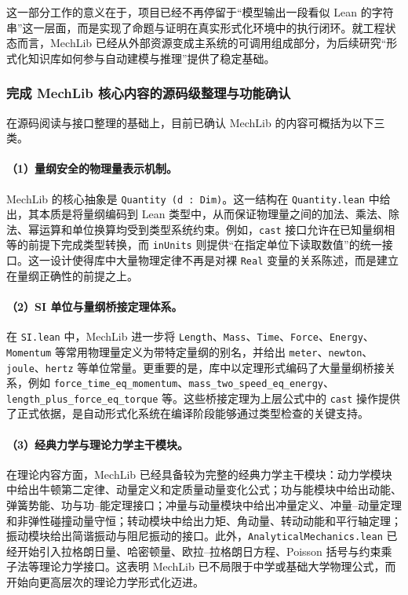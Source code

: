 \documentclass[12pt,a4paper]{ctexart}
\begin{document}
这一部分工作的意义在于，项目已经不再停留于“模型输出一段看似 Lean 的字符串”这一层面，而是实现了命题与证明在真实形式化环境中的执行闭环。就工程状态而言，MechLib 已经从外部资源变成主系统的可调用组成部分，为后续研究“形式化知识库如何参与自动建模与推理”提供了稳定基础。

\subsubsection{完成 MechLib 核心内容的源码级整理与功能确认}

在源码阅读与接口整理的基础上，目前已确认 MechLib 的内容可概括为以下三类。

\paragraph{（1）量纲安全的物理量表示机制。}
MechLib 的核心抽象是 \texttt{Quantity (d : Dim)}。这一结构在 \texttt{Quantity.lean} 中给出，其本质是将量纲编码到 Lean 类型中，从而保证物理量之间的加法、乘法、除法、幂运算和单位换算均受到类型系统约束。例如，\texttt{cast} 接口允许在已知量纲相等的前提下完成类型转换，而 \texttt{inUnits} 则提供“在指定单位下读取数值”的统一接口。这一设计使得库中大量物理定律不再是对裸 \texttt{Real} 变量的关系陈述，而是建立在量纲正确性的前提之上。

\paragraph{（2）SI 单位与量纲桥接定理体系。}
在 \texttt{SI.lean} 中，MechLib 进一步将 \texttt{Length}、\texttt{Mass}、\texttt{Time}、\texttt{Force}、\texttt{Energy}、\texttt{Momentum} 等常用物理量定义为带特定量纲的别名，并给出 \texttt{meter}、\texttt{newton}、\texttt{joule}、\texttt{hertz} 等单位常量。更重要的是，库中以定理形式编码了大量量纲桥接关系，例如 \texttt{force\_time\_eq\_momentum}、\texttt{mass\_two\_speed\_eq\_energy}、\texttt{length\_plus\_force\_eq\_torque} 等。这些桥接定理为上层公式中的 \texttt{cast} 操作提供了正式依据，是自动形式化系统在编译阶段能够通过类型检查的关键支持。

\paragraph{（3）经典力学与理论力学主干模块。}
在理论内容方面，MechLib 已经具备较为完整的经典力学主干模块：动力学模块中给出牛顿第二定律、动量定义和定质量动量变化公式；功与能模块中给出动能、弹簧势能、功与功--能定理接口；冲量与动量模块中给出冲量定义、冲量--动量定理和非弹性碰撞动量守恒；转动模块中给出力矩、角动量、转动动能和平行轴定理；振动模块给出简谐振动与阻尼振动的接口。此外，\texttt{AnalyticalMechanics.lean} 已经开始引入拉格朗日量、哈密顿量、欧拉--拉格朗日方程、Poisson 括号与约束乘子法等理论力学接口。这表明 MechLib 已不局限于中学或基础大学物理公式，而开始向更高层次的理论力学形式化迈进。
\end{document}
